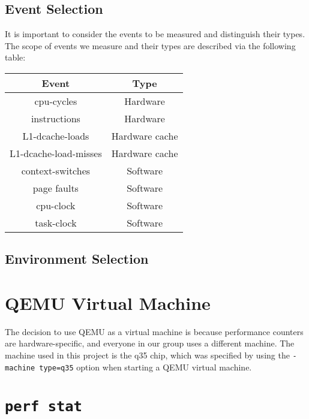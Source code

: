 \documentclass{article}
\begin{document}
\subsection{Event Selection}
It is important to consider the events to be measured and distinguish their types. The scope of events we measure and their types are described via the following table:
\begin{center}
    \begin{tabular}{|c|c|}
        \hline
        \textbf{Event} & \textbf{Type}  \\
        \hline
         cpu-cycles & Hardware\\
         instructions & Hardware\\
         L1-dcache-loads & Hardware cache\\
         L1-dcache-load-misses & Hardware cache\\
         context-switches & Software\\
         page faults & Software\\
         cpu-clock & Software\\
         task-clock & Software\\
    \hline
    \end{tabular}
\end{center}
\pagebreak
\subsection{Environment Selection}
\section{QEMU Virtual Machine}
The decision to use QEMU as a virtual machine is because performance counters are hardware-specific, and everyone in our group uses a different machine. The machine used in this project is the q35 chip, which was specified by using the \texttt{-machine type=q35} option when starting a QEMU virtual machine. %
\pagebreak
\section{\texttt{perf stat}}
\end{document}

